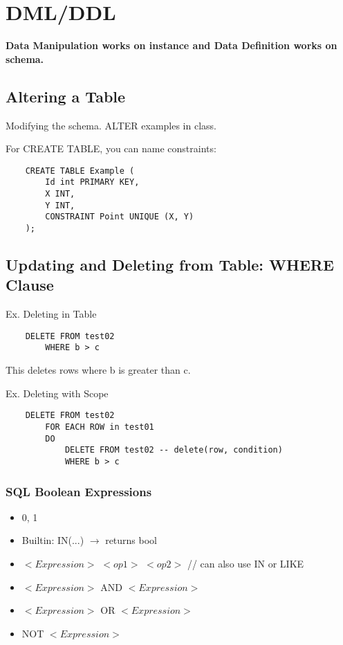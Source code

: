 \documentclass[twoside]{article}
\begin{document}
\section*{DML/DDL}

\textbf{Data Manipulation works on instance and Data Definition works on schema.}

\subsection*{Altering a Table}
Modifying the schema. ALTER examples in class.

For CREATE TABLE, you can name constraints: 
\begin{verbatim}
    CREATE TABLE Example (
        Id int PRIMARY KEY,
        X INT,
        Y INT,
        CONSTRAINT Point UNIQUE (X, Y)
    );
\end{verbatim}

\subsection*{Updating and Deleting from Table: WHERE Clause}

Ex. Deleting in Table
\begin{verbatim}
    DELETE FROM test02
        WHERE b > c
\end{verbatim}
This deletes rows where b is greater than c.

Ex. Deleting with Scope
\begin{verbatim}
    DELETE FROM test02
        FOR EACH ROW in test01
        DO 
            DELETE FROM test02 -- delete(row, condition)
            WHERE b > c
\end{verbatim}

\subsubsection*{SQL Boolean Expressions}
\begin{itemize}
    \item 0, 1
    \item Builtin: IN(...) $\longrightarrow$ returns bool
    \item $<Expression>$ $<op1>$ $<op2>$ // can also use IN or LIKE
    \item $<Expression>$ AND $<Expression>$
    \item $<Expression>$ OR $<Expression>$
    \item NOT $<Expression>$
\end{itemize}
\end{document}
